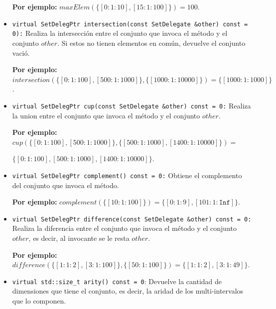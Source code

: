 \begin{itemize}
    \begin{center}
        \textbf{Por ejemplo:} $maxElem(\{[0: 1: 10], [15: 1: 100]\})= 100$.
    \end{center}

    \item \texttt{virtual SetDelegPtr intersection(const SetDelegate \&other) const = 0):}  
    Realiza la intersección entre el conjunto que invoca el método y el conjunto $other$. Si estos no tienen elementos en común, devuelve el conjunto vació.

    \begin{center}
        \textbf{Por ejemplo:} $intersection(\{[0: 1: 100], [500: 1: 1000]\},\{[1000: 1: 10000]\})= \{[1000: 1: 1000]\}$.
    \end{center}

    \item \texttt{virtual SetDelegPtr cup(const SetDelegate \&other) const = 0:}  
    Realiza la union entre el conjunto que invoca el método y el conjunto $other$.

    \begin{center}
        \textbf{Por ejemplo:} $cup(\{[0: 1: 100], [500: 1: 1000]\},\{[500: 1: 1000],[1400: 1: 10000]\})=$
        
        $ \{[0: 1: 100],[500: 1: 1000],[1400: 1: 10000]\}$.
    \end{center}

    \item \texttt{virtual SetDelegPtr complement() const = 0:}  
    Obtiene el complemento del conjunto que invoca el método.

    
    \begin{center}
        \textbf{Por ejemplo:} $complement(\{[10: 1: 100]\})= \{[0: 1: 9],[101: 1: \texttt{Inf}]\}$.
    \end{center}

    \item \texttt{virtual SetDelegPtr difference(const SetDelegate \&other) const = 0:}  
    Realiza la diferencia entre el conjunto que invoca el método y el conjunto $other$, es decir, al invocante se le resta $other$.

    \begin{center}
        \textbf{Por ejemplo:} $difference(\{[1: 1: 2], [3: 1: 100]\},\{[50: 1: 100]\})= \{[1: 1: 2], [3: 1: 49]\}$.
    \end{center}
    
        
    \item \texttt{virtual std::size\_t arity() const = 0}:  
    Devuelve la cantidad de dimensiones que tiene el conjunto, es decir, la aridad de los multi-intervalos que lo componen.


\end{itemize}
